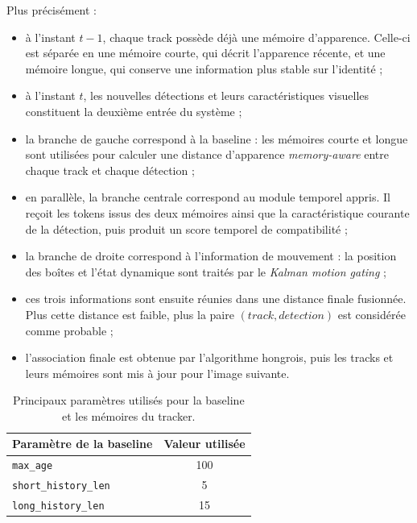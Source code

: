 \documentclass[11pt,a4paper]{article}
\begin{document}
Plus précisément :
\begin{itemize}
    \item à l'instant \(t-1\), chaque track possède déjà une mémoire d'apparence. Celle-ci est séparée en une mémoire courte, qui décrit l'apparence récente, et une mémoire longue, qui conserve une information plus stable sur l'identité ;
    \item à l'instant \(t\), les nouvelles détections et leurs caractéristiques visuelles constituent la deuxième entrée du système ;
    \item la branche de gauche correspond à la baseline : les mémoires courte et longue sont utilisées pour calculer une distance d'apparence \textit{memory-aware} entre chaque track et chaque détection ;
    \item en parallèle, la branche centrale correspond au module temporel appris. Il reçoit les tokens issus des deux mémoires ainsi que la caractéristique courante de la détection, puis produit un score temporel de compatibilité ;
    \item la branche de droite correspond à l'information de mouvement : la position des boîtes et l'état dynamique sont traités par le \textit{Kalman motion gating} ;
    \item ces trois informations sont ensuite réunies dans une distance finale fusionnée. Plus cette distance est faible, plus la paire \((track, detection)\) est considérée comme probable ;
    \item l'association finale est obtenue par l'algorithme hongrois, puis les tracks et leurs mémoires sont mis à jour pour l'image suivante.
\end{itemize}

\vspace{2em}

\begin{table}[H]
\centering
\begin{tabular}{l c}
\toprule
\textbf{Paramètre de la baseline} & \textbf{Valeur utilisée} \\
\midrule
\texttt{max\_age} & 100 \\
\texttt{short\_history\_len} & 5 \\
\texttt{long\_history\_len} & 15 \\
\bottomrule
\end{tabular}
\caption{Principaux paramètres utilisés pour la baseline et les mémoires du tracker.}
\end{table}
\end{document}
